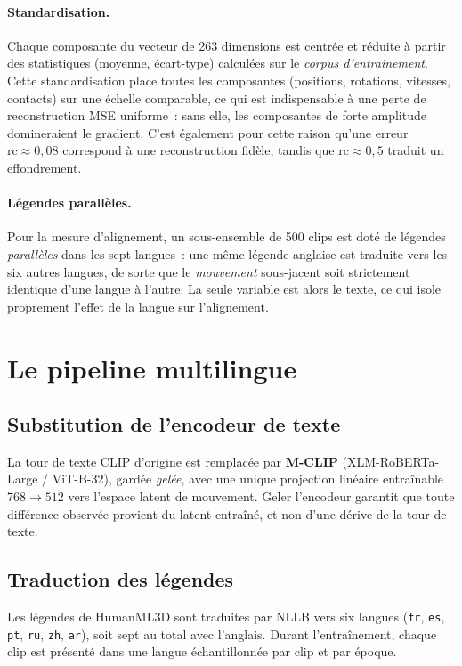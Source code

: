 \documentclass[12pt,a4paper,oneside]{report}
\theoremstyle{definition}
\theoremstyle{plain}
\newcommand{\rc}{\mathrm{rc}}
\begin{document}
\paragraph{Standardisation.} Chaque composante du vecteur de 263 dimensions est
centrée et réduite à partir des statistiques (moyenne, écart-type) calculées sur le
\emph{corpus d'entraînement}. Cette standardisation place toutes les composantes
(positions, rotations, vitesses, contacts) sur une échelle comparable, ce qui est
indispensable à une perte de reconstruction MSE uniforme~: sans elle, les
composantes de forte amplitude domineraient le gradient. C'est également pour cette
raison qu'une erreur $\rc\approx0{,}08$ correspond à une reconstruction fidèle,
tandis que $\rc\approx0{,}5$ traduit un effondrement.

\paragraph{Légendes parallèles.} Pour la mesure d'alignement, un sous-ensemble de
500 clips est doté de légendes \emph{parallèles} dans les sept langues~: une même
légende anglaise est traduite vers les six autres langues, de sorte que le
\emph{mouvement} sous-jacent soit strictement identique d'une langue à l'autre. La
seule variable est alors le texte, ce qui isole proprement l'effet de la langue sur
l'alignement.

\section{Le pipeline multilingue}
\label{sec:pipeline}

\subsection{Substitution de l'encodeur de texte}
La tour de texte CLIP d'origine est remplacée par \textbf{M-CLIP}
(XLM-RoBERTa-Large / ViT-B-32), gardée \emph{gelée}, avec une unique projection
linéaire entraînable $768\rightarrow512$ vers l'espace latent de mouvement. Geler
l'encodeur garantit que toute différence observée provient du latent entraîné, et
non d'une dérive de la tour de texte.

\subsection{Traduction des légendes}
Les légendes de HumanML3D sont traduites par NLLB vers six langues
(\texttt{fr}, \texttt{es}, \texttt{pt}, \texttt{ru}, \texttt{zh}, \texttt{ar}),
soit sept au total avec l'anglais. Durant l'entraînement, chaque clip est présenté
dans une langue échantillonnée par clip et par époque.
\end{document}
